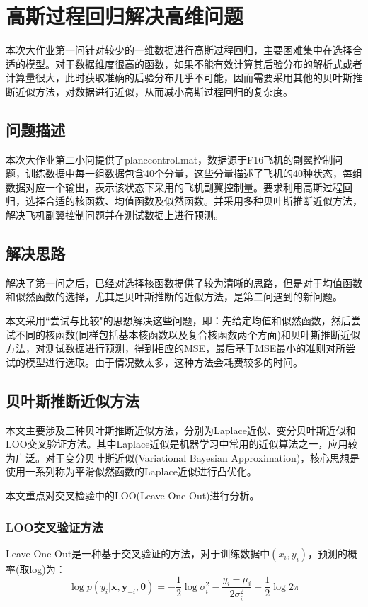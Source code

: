 \documentclass[10pt,twocolumn]{article}
\begin{document}
\section{高斯过程回归解决高维问题}
本次大作业第一问针对较少的一维数据进行高斯过程回归，主要困难集中在选择合适的模型。对于数据维度很高的函数，如果不能有效计算其后验分布的解析式或者计算量很大，此时获取准确的后验分布几乎不可能，因而需要采用其他的贝叶斯推断近似方法，对数据进行近似，从而减小高斯过程回归的复杂度。

\subsection{问题描述}
本次大作业第二小问提供了planecontrol.mat，数据源于F16飞机的副翼控制问题，训练数据中每一组数据包含40个分量，这些分量描述了飞机的40种状态，每组数据对应一个输出，表示该状态下采用的飞机副翼控制量。要求利用高斯过程回归，选择合适的核函数、均值函数及似然函数。并采用多种贝叶斯推断近似方法，解决飞机副翼控制问题并在测试数据上进行预测。

\subsection{解决思路}
解决了第一问之后，已经对选择核函数提供了较为清晰的思路，但是对于均值函数和似然函数的选择，尤其是贝叶斯推断的近似方法，是第二问遇到的新问题。

本文采用``尝试与比较"的思想解决这些问题，即：先给定均值和似然函数，然后尝试不同的核函数(同样包括基本核函数以及复合核函数两个方面)和贝叶斯推断近似方法，对测试数据进行预测，得到相应的MSE，最后基于MSE最小的准则对所尝试的模型进行选取。由于情况数太多，这种方法会耗费较多的时间。

\subsection{贝叶斯推断近似方法}
本文主要涉及三种贝叶斯推断近似方法，分别为Laplace近似、变分贝叶斯近似和LOO交叉验证方法。其中Laplace近似是机器学习中常用的近似算法之一，应用较为广泛。对于变分贝叶斯近似(Variational Bayesian Approximation)，核心思想是使用一系列称为平滑似然函数的Laplace近似进行凸优化。

本文重点对交叉检验中的LOO(Leave-One-Out)进行分析。

\subsubsection{LOO交叉验证方法}

Leave-One-Out是一种基于交叉验证的方法，对于训练数据中$(x_{i},y_{i})$，预测的概率(取log)为：
\[\log p(y_{i}\vert \mathbf{x},\mathbf{y}_{-i},\mathbf{\theta}) = -\frac{1}{2}\log\sigma^{2}_{i} - \frac{y_{i}-\mu_{i}}{2\sigma^{2}_{i}} - \frac{1}{2}\log2\pi\]
\end{document}
